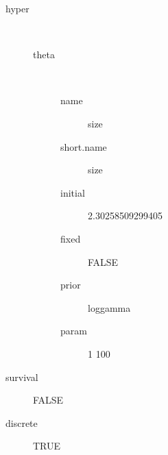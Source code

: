 \begin{description}
	\item[hyper]\ 
	 \begin{description}
	 	\item[theta]\ 
	 	 \begin{description}
	 	 	 \item[ name ] size 
	 	 	 \item[ short.name ] size 
	 	 	 \item[ initial ] 2.30258509299405 
	 	 	 \item[ fixed ] FALSE 
	 	 	 \item[ prior ] loggamma 
	 	 	 \item[ param ] 1 100 
	 	 \end{description}
	 \end{description}
	 \item[ survival ] FALSE 
	 \item[ discrete ] TRUE 
\end{description}
